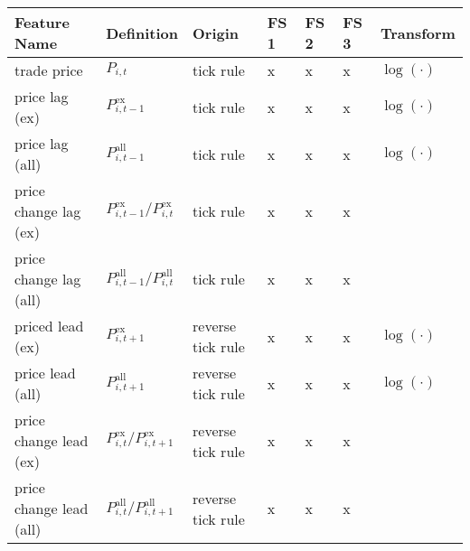 \begin{threeparttable}
    \begin{tabular}{@{}lllllll@{}}
        \toprule
        Feature Name              & Definition                                                                                                     & Origin               & FS 1 & FS 2 & FS 3 & Transform     \\ \midrule
        trade price               & $P_{i, t}$                                                                                                     & tick rule            & x    & x    & x    & $\log(\cdot)$ \\
        price lag (ex)            & $P_{i, t-1}^{\text{ex}}$\tnote{*}                                                                              & tick rule            & x    & x    & x    & $\log(\cdot)$ \\
        price lag (all)           & $P_{i, t-1}^{\text{all}}$\tnote{*}                                                                             & tick rule            & x    & x    & x    & $\log(\cdot)$ \\
        price change lag (ex)     & $P_{i, t-1}^{\text{ex}}/P_{i, t}^{\text{ex}}$\tnote{*}                                                         & tick rule            & x    & x    & x    &               \\
        price change lag (all)    & $P_{i, t-1}^{\text{all}}/P_{i, t}^{\text{all}}$\tnote{*}                                                       & tick rule            & x    & x    & x    &               \\
        priced lead (ex)          & $P_{i, t+1}^{\text{ex}}$\tnote{*}                                                                              & reverse tick rule    & x    & x    & x    & $\log(\cdot)$ \\
        price lead (all)          & $P_{i, t+1}^{\text{all}}$\tnote{*}                                                                             & reverse tick rule    & x    & x    & x    & $\log(\cdot)$ \\
        price change lead (ex)    & $P_{i, t}^{\text{ex}}/P_{i, t+1}^{\text{ex}}$\tnote{*}                                                         & reverse tick rule    & x    & x    & x    &               \\
        price change lead (all)   & $P_{i, t}^{\text{all}}/P_{i, t+1}^{\text{all}}$\tnote{*}                                                       & reverse tick rule    & x    & x    & x    &               \\

\end{tabular}
\end{threeparttable}

